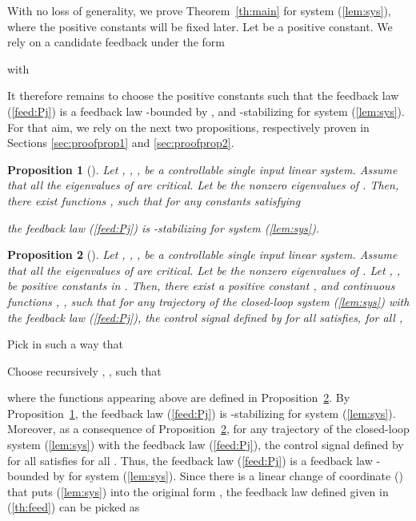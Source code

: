 \documentclass[letterpaper, 10pt]{article}
\newtheorem{propo}{Proposition}
\newcommand{\rref}[1]{(\ref{#1})}
\begin{document}
With no loss of generality, we prove Theorem~\ref{th:main} for system \rref{lem:sys}, where the positive constants  will be fixed later. Let  be a positive constant. We rely on a candidate feedback  under the form 
 
with 
 
It therefore remains to choose the positive constants  such that the feedback law \rref{feed:Pj} is a feedback law -bounded by , and  -stabilizing for system \rref{lem:sys}. For that aim, we rely on the next two propositions, respectively proven in Sections \ref{sec:proofprop1} and \ref{sec:proofprop2}. 

\begin{propo}[]
\label{prop:SISSl}
Let , , , be a controllable single input linear system. Assume that all the eigenvalues of  are critical. Let  be the nonzero eigenvalues of . Then, there exist  functions ,  such that for any constants  satisfying

 the feedback law \rref{feed:Pj} is -stabilizing for system \rref{lem:sys}.
\end{propo}

\begin{propo}[]
\label{prop:bound:U}
Let , , , be a controllable single input linear system. Assume that all the eigenvalues of  are critical. Let  be the nonzero eigenvalues of . Let , , be positive constants in .
Then, there exist a positive constant , and continuous functions , , such that for any trajectory of the closed-loop system \rref{lem:sys} with the feedback law \rref{feed:Pj}, the control signal  defined by  for all  satisfies, for all ,

\end{propo}

Pick  in such a way that
 
Choose recursively , , such that
 
where the functions  appearing above are defined in Proposition~\ref{prop:bound:U}.
By Proposition~\ref{prop:SISSl}, the feedback law \rref{feed:Pj} is -stabilizing for system \rref{lem:sys}. Moreover, as a consequence of Proposition~\ref{prop:bound:U}, for any trajectory of the closed-loop system \rref{lem:sys} with the feedback law \rref{feed:Pj}, the control signal  defined by  for all  satisfies  for all . Thus, the feedback law \rref{feed:Pj} is a  feedback law -bounded by  for system \rref{lem:sys}. Since there is a linear change of coordinate () that puts \rref{lem:sys} into the original form , the feedback law defined given in \rref{th:feed} can be picked as
 
\end{document}
